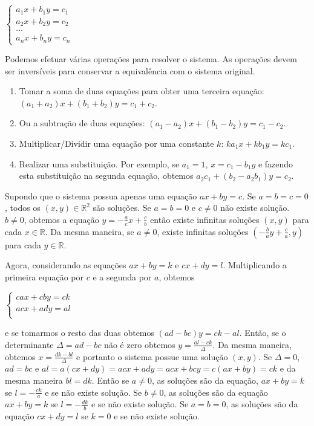 $\left\{
\begin{aligned}
  a_1 x + b_1 y = c_1 \\
  a_2 x + b_2 y = c_2 \\
  \ldots \\
  a_n x + b_n y = c_n
\end{aligned}\right.$

Podemos efetuar várias operações para resolver o sistema. As operações devem ser
inversíveis para conservar a equivalência com o sistema original.

\begin{enumerate}
\item Tomar a soma de duas equações para obter uma terceira equação:
${(a_1+a_2)} x + {(b_1+b_2)} y = c_1 + c_2$.
\item Ou a subtração de duas equações: ${(a_1-a_2)} x + {(b_1-b_2)} y = c_1 - c_2$.
\item Multiplicar/Dividir uma equação por uma constante $k$:
  $k a_1 x + k b_1 y = k c_1$.
\item Realizar uma substituição. Por exemplo, se $a_1 = 1$,
  $x = c_1 - b_1 y$ e fazendo esta substituição na segunda equação, obtemos
  $a_2 c_1 + (b_2 - a_2 b_1) y  = c_2$.
\end{enumerate}

Supondo que o sistema possua apenas uma equação $a x + b y = c$.
Se $a = b = c = 0$, todos os $(x,y) \in {\mathbb R}^2$ são soluções.
Se $a = b = 0$ e $c \neq 0$ não existe solução. $b \neq 0$, obtemos a
equação $y = -\frac{a}{c}x +\frac{c}{b}$ então existe infinitas soluções
$(x, y)$ para cada $x \in {\mathbb R}$. Da mesma maneira, se $a \neq 0$, existe
infinitas soluções $({-\frac{b}{a}y+\frac{c}{a}}, y)$
para cada $y \in {\mathbb R}$.

Agora, considerando as equações $ax+by=k$ e $cx+dy=l$. Multiplicando
a primeira equação por $c$ e a segunda por $a$, obtemos

$\left\{
\begin{aligned}
  ca x + cb y = ck \\
  ac x + ad y = al \\
\end{aligned}\right.$

e se tomarmos o resto das duas obtemos
${(ad - bc)} y = ck - al$. Então, se o determinante
$\Delta = ad - bc$ não é zero obtemos $y = \frac{al - ck}{\Delta}$. Da
mesma maneira, obtemos $x = \frac{dk - bl}{\Delta}$ e portanto o sistema
possue uma solução $(x, y)$. Se $\Delta = 0$, $ad = bc$ e
$al = a{(cx+dy)} = acx + ady = acx+bcy = c{(ax+by)} = ck$ e da mesma maneira
$bl = dk$. Então se $a \neq 0$, as soluções são da equação,
$ax + by = k$ se $l = -\frac{ck}{a}$ e se não existe solução. Se $b \neq 0$,
as soluções são da equação $ax + by = k$ se $l = -\frac{dk}{b}$
e se não existe solução. Se $a = b = 0$, as soluções são da equação
$cx + dy = l$ se $k = 0$ e se não existe solução.

